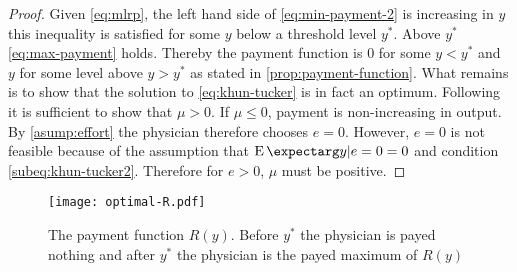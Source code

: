 \begin{proof}
Given \cref{eq:mlrp}, the left hand side of \cref{eq:min-payment-2} is increasing in $y$ this inequality is satisfied for some $y$ below a threshold level $y^*$. Above $y^*$ \cref{eq:max-payment} holds. Thereby the payment function is 0 for some $y<y^*$ and $y$ for some level above $y> y^*$ as stated in \cref{prop:payment-function}.
What remains is to show that the solution to \cref{eq:khun-tucker} is in fact an optimum. Following \textcite{Rogerson1985FirstOrder} it is sufficient to show that $\mu>0$. If $\mu\leq0$, payment is non-increasing in output. By \cref{asump:effort} the physician therefore chooses $e=0$. However, $e=0$ is not feasible because of the assumption that $\cEX{y|e=0}=0$ and condition \cref{subeq:khun-tucker2}. Therefore for $e>0$, $\mu$ must be positive. 
\end{proof}

\begin{figure}[htbp]
    \centering
    \texttt{[image: optimal-R.pdf]}
    \caption{The payment function $R(y)$. Before $y^*$ the physician is payed nothing and after $y^*$ the physician is the payed maximum of $R(y)$ }
    \label{fig:label}
\end{figure}

